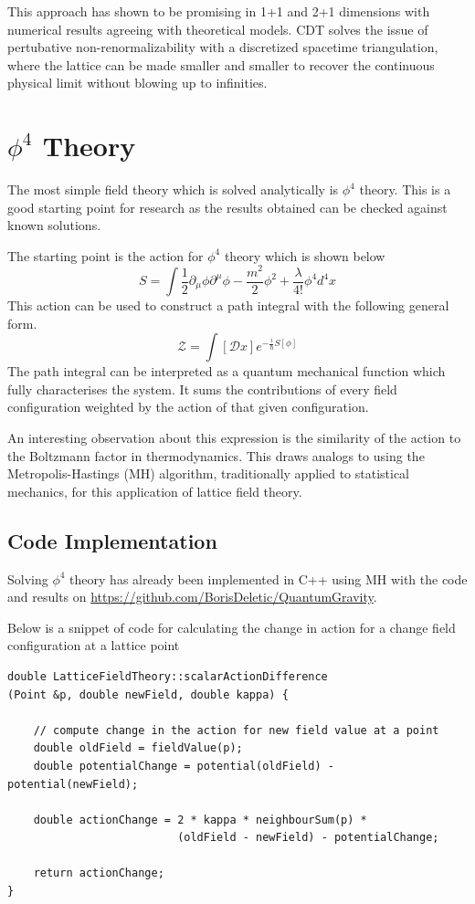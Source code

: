 \documentclass[a4paper]{article}
\begin{document}
    This approach has shown to be promising in 1+1 and 2+1 dimensions with numerical results agreeing with theoretical models. CDT solves the issue of pertubative non-renormalizability with a discretized spacetime triangulation, where the lattice can be made smaller and smaller to recover the continuous physical limit without blowing up to infinities. 

    \section{$ \phi^4$ Theory}
    The most simple field theory which is solved analytically is
    $\phi^4$ theory. This is a good starting point for research as the
    results obtained can be checked against known solutions.

    The starting point is the action for $\phi^4$ theory which is shown below
    $$S = \int{\frac{1}{2} \partial_{\mu} \phi \partial^{\mu} \phi
      -\frac{m^2}{2} \phi^2  + \frac{\lambda}{4!} \phi^4 d^4x}$$
    This action can be used to construct a path integral with the
    following general form.
    $$\mathcal{Z} = \int{ [\mathcal{D}x] e^{-\frac{i}{\hbar} S[\phi]
      } }$$
    The path integral can be interpreted as a quantum mechanical
    function which fully characterises the system. It sums the
    contributions of every field configuration weighted by the action
    of that given configuration.

    An interesting observation about this expression is the similarity
    of the action to the Boltzmann factor in thermodynamics. This
    draws analogs to using the Metropolis-Hastings (MH) algorithm,
    traditionally applied to statistical mechanics, for this application
    of lattice field theory.

    \subsection{Code Implementation}
    Solving $\phi^4$ theory has already been implemented in C++ using
    MH with the code and results on
    \url{https://github.com/BorisDeletic/QuantumGravity}.

    Below is a snippet of code for calculating the change in action
    for a change field configuration at a lattice point
\begin{lstlisting}
double LatticeFieldTheory::scalarActionDifference
(Point &p, double newField, double kappa) {

    // compute change in the action for new field value at a point
    double oldField = fieldValue(p);
    double potentialChange = potential(oldField) - potential(newField);

    double actionChange = 2 * kappa * neighbourSum(p) * 
                          (oldField - newField) - potentialChange;

    return actionChange;
}
\end{lstlisting}
\end{document}
